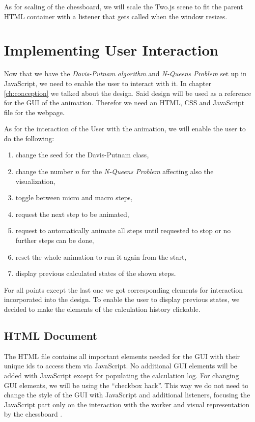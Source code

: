 As for scaling of the chessboard, we will scale the Two.js scene to fit the parent HTML container with a listener that gets called when the window resizes.

\section{Implementing User Interaction}
\label{sec:impUI}
Now that we have the \textit{Davis-Putnam algorithm} and \textit{N-Queens Problem} set up in JavaScript, we need to enable the user to interact with it. In chapter \ref{ch:conception} we talked about the design. Said design will be used as a reference for the GUI of the animation. Therefor we need an HTML, CSS and JavaScript file for the webpage.

As for the interaction of the User with the animation, we will enable the user to do the following:

\begin{enumerate}
    \item change the seed for the Davis-Putnam class,
    \item change the number $n$ for the \textit{N-Queens Problem} affecting also the visualization,
    \item toggle between micro and macro steps,
    \item request the next step to be animated,
    \item request to automatically animate all steps until requested to stop or no further steps can be done,
    \item reset the whole animation to run it again from the start,
    \item display previous calculated states of the shown steps.
\end{enumerate}

For all points except the last one we got corresponding elements for interaction incorporated into the design. To enable the user to display previous states, we decided to make the elements of the calculation history clickable.

\subsection{HTML Document}
\label{sub:impHTML}
The HTML file contains all important elements needed for the GUI with their unique ids to access them via JavaScript. No additional GUI elements will be added with JavaScript except for populating the calculation log. For changing GUI elements, we will be using the ``checkbox hack''. This way we do not need to change the style of the GUI with JavaScript and additional listeners, focusing the JavaScript part only on the interaction with the worker and visual representation by the chessboard \cite{Coyier2012}.

